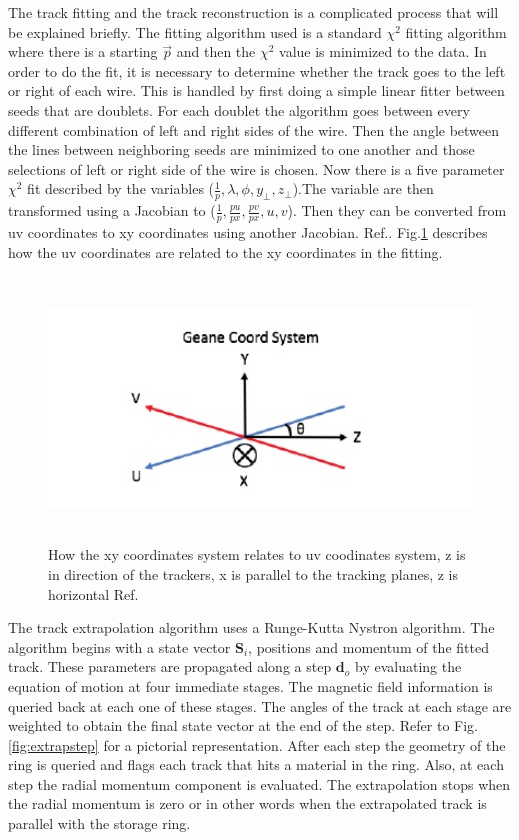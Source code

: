 \documentclass[./Thesis]{subfiles}
\begin{document}
	The track fitting and the track reconstruction is a complicated process that will be explained briefly.  The fitting algorithm used is a standard $\chi^2$ fitting algorithm where there is a starting $\vec{p}$ and then the $\chi^2$ value is minimized to the data.  In order to do the fit, it is necessary to determine whether the track goes to the left or right of each wire. This is handled by first doing a simple linear fitter between seeds that are doublets.  For each doublet the algorithm goes between every different combination of left and right sides of the wire.  Then the angle between the lines between neighboring seeds are minimized to one another and those selections of left or right side of the wire is chosen.  Now there is a five parameter $\chi^2$ fit described by the variables ($\frac{1}{p},\lambda,\phi,y_\perp,z_\perp$).The variable are then transformed using a Jacobian to ($\frac{1}{p},\frac{pu}{px},\frac{pv}{px},u,v$). Then they can be converted from uv coordinates to xy coordinates using another Jacobian. Ref.\cite{nickKin}.  Fig.\ref{fig:geanecoord} describes how the uv coordinates are related to the xy coordinates in the fitting.	
	
	
\begin{figure}
	\centerline{\includegraphics[height=70mm]{GeaneCoord.jpeg}}
	\caption[Geane Coordinate System]{  How the xy coordinates system relates to uv coodinates system, z is in direction of the trackers, x is parallel to the tracking planes, z is horizontal Ref.\cite{nickKin}}
	\label{fig:geanecoord}
\end{figure} 
	
	The track extrapolation algorithm uses a Runge-Kutta Nystron algorithm.  The algorithm begins with a state vector $\textbf{S}_i$, positions and momentum of the fitted track.  These parameters are propagated along a step $\textbf{d}_o$ by evaluating the equation of motion at four immediate stages.  The magnetic field information is queried back at each one of these stages.  The angles of the track at each stage are weighted to obtain the final state vector at the end of the step.  Refer to Fig.\ref{fig:extrapstep} for a pictorial representation.  After each step the geometry of the ring is queried and flags each track that hits a material in the ring.  Also, at each step the radial momentum component is evaluated. The extrapolation stops when the radial momentum is zero or in other words when the extrapolated track is parallel with the storage ring. %
	
\end{document}
